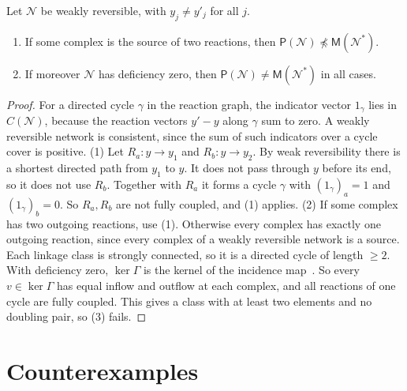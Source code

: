 \documentclass[11pt,a4paper]{report}
\newcommand{\Net}{\mathcal{N}}
\newcommand{\Pre}{\mathsf{P}}
\newcommand{\Mips}{\mathsf{M}}
\newcommand{\nrefi}{\not\preceq}
\begin{document}
\begin{corollary}\label{cor:wrB}
Let \(\Net\) be weakly reversible, with \(y_j\neq y'_j\) for all \(j\).
\begin{enumerate}
\item If some complex is the source of two reactions, then \(\Pre(\Net)\nrefi\Mips(\Net^*)\).
\item If moreover \(\Net\) has deficiency zero, then \(\Pre(\Net)\neq\Mips(\Net^*)\) in all cases.
\end{enumerate}
\end{corollary}
\begin{proof}
For a directed cycle \(\gamma\) in the reaction graph, the indicator vector \(1_\gamma\) lies in \(C(\Net)\), because
the reaction vectors \(y'-y\) along \(\gamma\) sum to zero. A weakly reversible network is consistent, since the sum
of such indicators over a cycle cover is positive. (1) Let \(R_a\colon y\to y_1\) and \(R_b\colon y\to y_2\). By weak
reversibility there is a shortest directed path from \(y_1\) to \(y\). It does not pass through \(y\) before its end,
so it does not use \(R_b\). Together with \(R_a\) it forms a cycle \(\gamma\) with \((1_\gamma)_a=1\) and
\((1_\gamma)_b=0\). So \(R_a,R_b\) are not fully coupled, and (1) applies. (2) If some complex
has two outgoing reactions, use (1). Otherwise every complex has exactly one outgoing reaction, since every complex of
a weakly reversible network is a source. Each linkage class is strongly connected, so it is a directed cycle of length
\(\ge2\). With deficiency zero, \(\ker\Gamma\) is the kernel of the incidence map~\autocite{Feinberg2019}. So every
\(v\in\ker\Gamma\) has equal inflow and outflow at each complex, and all reactions of one cycle are fully coupled.
This gives a class with at least two elements and no doubling pair, so (3) fails.
\end{proof}

\section{Counterexamples}
\end{document}
